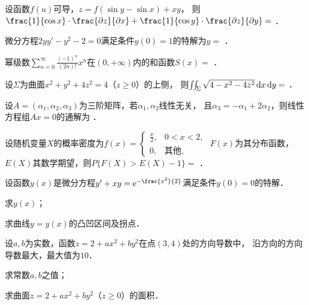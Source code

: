\documentclass[plain,noanswer,medmath]{../../template/jnuexam}
\begin{document}


\begin{problem}
设函数$f(u)$可导，$z = f(\sin y - \sin x) + xy$，
则$\frac{1}{\cos x} \cdot \frac{\pdz}{\pdx} + \frac{1}{\cos y} \cdot \frac{\pdz}{\pdy} =$ \fillin{}．
\end{problem}


\begin{problem}
微分方程$2yy' - y^2 - 2 = 0$满足条件$y(0) = 1$的特解为$y =$ \fillin{}．
\end{problem}


\begin{problem}
幂级数$\sum_{n = 0}^{\infty}\frac{(- 1)^n}{(2n)!}x^n$在$(0, +\infty)$内的和函数$S(x) =$ \fillin{}．
\end{problem}


\begin{problem}
设$\Sigma$为曲面$x^2 + y^2 + 4z^2 = 4$（$z \ge 0$）的上侧，
则$\iint_{\Sigma}\sqrt{4 - x^2 - 4z^2} \mathop{}\!\mathrm{d} x\mathop{}\!\mathrm{d} y =$ \fillin{}．
\end{problem}


\begin{problem}
设$A = (\alpha_1,\alpha_2,\alpha_3)$为三阶矩阵，若$\alpha_1,\alpha_2$线性无关，
且$\alpha_3 = - \alpha_1 + 2\alpha_2$，则线性方程组$Ax = 0$的通解为 \fillin{}．
\end{problem}


\begin{problem}
设随机变量$X$的概率密度为$f(x) = \begin{cases}
  \frac{x}{2}, & 0 < x < 2, \\
            0, & \text{其他},
\end{cases}$ $F(x)$为其分布函数，$E(X)$其数学期望，则$P\{F(X) > E(X) - 1\} =$ \fillin{}．
\end{problem}




\begin{problem}[points=10]
设函数$y(x)$是微分方程$y' + xy = \e^{- \frac{x^2}{2}}$满足条件$y(0) = 0$的特解．\par
\begin{enumerate*}
\item 求$y(x)$；
\item 求曲线$y = y(x)$的凸凹区间及拐点．
\end{enumerate*}
\end{problem}


\begin{problem}[points=10]
设$a,b$为实数，函数$z = 2 + ax^2 + by^2$在点$(3,4)$处的方向导数中，
沿方向的方向导数最大，最大值为$10$．\par
\begin{enumerate*}
\item 求常数$a,b$之值；
\item 求曲面$z = 2 + ax^2 + by^2$（$z \ge 0$）的面积．
\end{enumerate*}
\end{problem}
\end{document}
